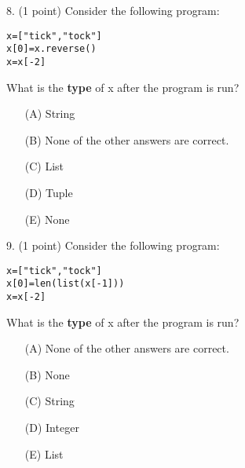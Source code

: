 \documentclass{article}
\begin{document}
\noindent
\begin{minipage}{\textwidth}
8. (1 point)
Consider the following program:
\begin{verbatim}
x=["tick","tock"]
x[0]=x.reverse()
x=x[-2]
\end{verbatim}
What is the \textbf{type} of x after the program is run?

\begin{enumerate}
\item[(A)]
String

\item[(B)]
None of the other answers are correct.

\item[(C)]
List

\item[(D)]
Tuple

\item[(E)]
None

\end{enumerate}
\end{minipage}
\vspace{10em}
\filbreak\vfil{}\vfilneg

\noindent
\begin{minipage}{\textwidth}
9. (1 point)
Consider the following program:
\begin{verbatim}
x=["tick","tock"]
x[0]=len(list(x[-1]))
x=x[-2]
\end{verbatim}
What is the \textbf{type} of x after the program is run?

\begin{enumerate}
\item[(A)]
None of the other answers are correct.

\item[(B)]
None

\item[(C)]
String

\item[(D)]
Integer

\item[(E)]
List

\end{enumerate}
\end{minipage}
\vspace{10em}
\filbreak\vfil{}\vfilneg
\end{document}

